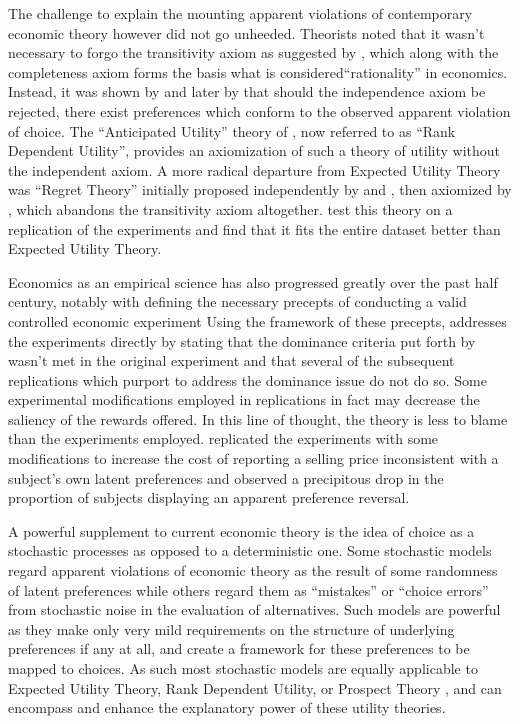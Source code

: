 The challenge to explain the mounting apparent violations of contemporary economic theory however did not go unheeded.
Theorists noted that it wasn't necessary to forgo the transitivity axiom as suggested by \textcite[623]{Grether1979}, which along with the completeness axiom forms the basis what is considered\enquote{rationality} in economics.
Instead, it was shown by \textcite{Holt1986} and later by \textcite{Karni1987} that should the independence axiom be rejected, there exist preferences which conform to the observed apparent violation of choice.
The \enquote{Anticipated Utility} theory of \textcite{Quiggin1982}, now referred to as \enquote{Rank Dependent Utility}, provides an axiomization of such a theory of utility without the independent axiom.
A more radical departure from Expected Utility Theory was \enquote{Regret  Theory} initially proposed independently by \textcite{Bell1982} and \textcite{Loomes1982}, then axiomized by \textcite{Fishburn1987}, which abandons the transitivity axiom altogether.
\textcite{Loomes1989} test this theory on a replication of the \textcite{Grether1979} experiments and find that it fits the entire dataset better than Expected Utility Theory.

Economics as an empirical science has also progressed greatly over the past half century, notably with \textcite{Smith1982} defining the necessary precepts of conducting a valid controlled economic experiment
Using the framework of these precepts, \textcite{Harrison1994} addresses the \textcite{Grether1979} experiments directly by stating that the dominance criteria put forth by \textcite{Smith1982} wasn't met in the original experiment and that several of the subsequent replications which purport to address the dominance issue do not do so.
Some experimental modifications employed in replications in fact may decrease the saliency of the rewards offered.
In this line of thought, the theory is less to blame than the experiments employed.
\textcite[236-239]{Harrison1994} replicated the\textcite{Grether1979} experiments with some modifications to increase the cost of reporting a selling price inconsistent with a subject's own latent preferences and observed a precipitous drop in the proportion of subjects displaying an apparent preference reversal.


A powerful supplement to current economic theory is the idea of choice as a stochastic processes as opposed to a deterministic one.
Some stochastic models regard apparent violations of economic theory as the result of some randomness of latent preferences while others regard them as \enquote{mistakes} or \enquote{choice errors} from stochastic noise in the evaluation of alternatives.
Such models are powerful as they make only very mild requirements on the structure of underlying preferences if any at all, and create a framework for these preferences to be mapped to choices.
As such most stochastic models are equally applicable to Expected Utility Theory, Rank Dependent Utility, or Prospect Theory \parencite{Kahneman1979, Tversky1992}, and can encompass and enhance the explanatory power of these utility theories.


